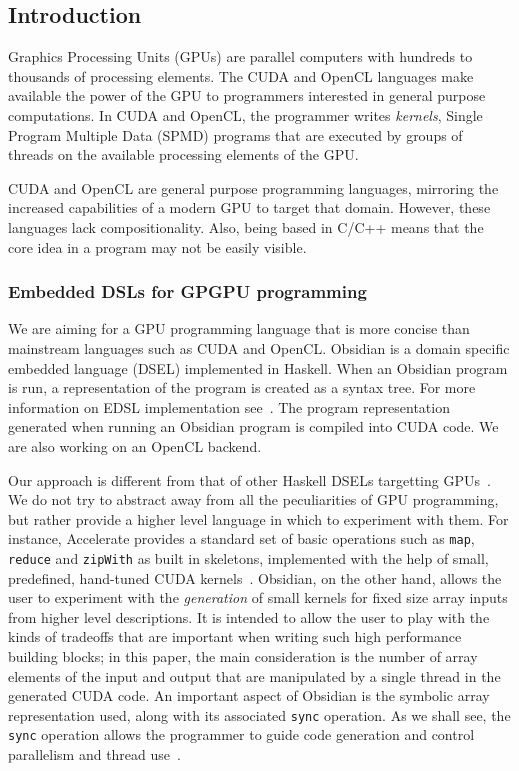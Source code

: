 

\subsection{Introduction} 

%


Graphics Processing Units (GPUs) are parallel computers with hundreds 
to thousands of processing elements. The CUDA and OpenCL languages  
make available the power of the GPU to programmers interested in general 
purpose computations. In CUDA and OpenCL, the programmer writes {\em kernels}, 
Single Program Multiple Data (SPMD) programs that are executed by groups 
of threads on the available processing elements of the GPU.  

CUDA and OpenCL are general purpose programming languages, mirroring the 
increased capabilities of a modern GPU to target that domain. However, these 
languages lack compositionality. 
Also, being based in C/C++ means that the core idea in a program may
not be easily visible.  

\subsubsection{Embedded DSLs for GPGPU programming} 
We are aiming for a GPU programming language that is more
concise than mainstream
languages such as CUDA and OpenCL. 
Obsidian is a
domain specific embedded language (DSEL) implemented in Haskell.
When an Obsidian program is run, a representation of the program is created 
as a syntax tree. For more information on EDSL implementation see~.
The program representation generated when running an Obsidian program 
is compiled into CUDA code. We are also working on an OpenCL backend.

Our approach is different from that of other Haskell DSELs targetting \newline
GPUs~. 
We do not try to abstract away from 
all the peculiarities of GPU programming, but rather provide a higher 
level language in which to experiment with them.
For instance,
Accelerate provides a standard set of basic operations such as 
{\tt map}, {\tt reduce} and {\tt zipWith} as built in skeletons, implemented
with the help of small, predefined, hand-tuned CUDA kernels~. 
Obsidian, on the other hand, allows the user to experiment with the
{\em generation} of small kernels for fixed size array inputs
from higher level descriptions.
It is intended to allow the user to play with the kinds of tradeoffs that are important
when writing such high performance building blocks; in this paper, the main consideration
is the number of array elements of the input and output that are manipulated
by a single thread in the generated CUDA code.
An important aspect of Obsidian is the symbolic array representation used, along
with its associated {\tt sync} operation. As we shall see, the {\tt sync} operation
allows the programmer to guide code generation and control parallelism and thread
use~.





